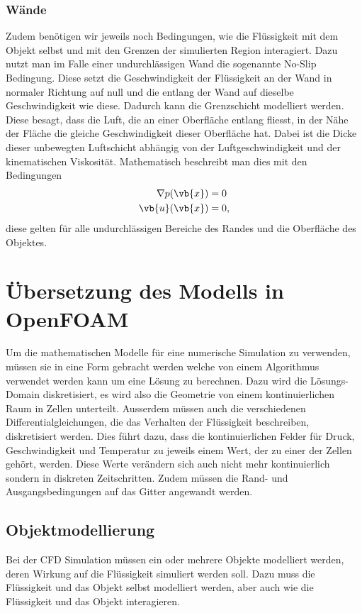 \subsubsection{Wände}
Zudem benötigen wir jeweils noch Bedingungen, wie die Flüssigkeit mit dem Objekt selbst und mit den Grenzen der simulierten Region interagiert.
Dazu nutzt man im Falle einer undurchlässigen Wand die sogenannte No-Slip Bedingung. 
Diese setzt die Geschwindigkeit der Flüssigkeit an der Wand in normaler Richtung auf null und die entlang der Wand auf dieselbe Geschwindigkeit wie diese.
Dadurch kann die Grenzschicht modelliert werden. Diese besagt, dass die Luft, die an einer Oberfläche entlang fliesst, in der Nähe der Fläche die gleiche Geschwindigkeit dieser Oberfläche hat.
Dabei ist die Dicke dieser unbewegten Luftschicht abhängig von der Luftgeschwindigkeit und der kinematischen Viskosität.
Mathematisch beschreibt man dies mit den Bedingungen
\begin{align*}
 \nabla p(\vb{x}) &= 0 \\
\vb{u}(\vb{x}) &= 0 ,
\end{align*}
diese gelten für alle undurchlässigen Bereiche des Randes und die Oberfläche des Objektes.

\section{Übersetzung des Modells in OpenFOAM}
Um die mathematischen Modelle für eine numerische Simulation zu verwenden, müssen sie in eine Form gebracht werden welche von einem Algorithmus verwendet werden kann um eine Lösung zu berechnen.
Dazu wird die Lösungs-Domain diskretisiert, es wird also die Geometrie von einem kontinuierlichen Raum in Zellen unterteilt.
Ausserdem müssen auch die verschiedenen Differentialgleichungen, die das Verhalten der Flüssigkeit beschreiben, diskretisiert werden.
Dies führt dazu, dass die kontinuierlichen Felder für Druck, Geschwindigkeit und Temperatur zu jeweils einem Wert, der zu einer der Zellen gehört, werden.
Diese Werte verändern sich auch nicht mehr kontinuierlich sondern in diskreten Zeitschritten.
Zudem müssen die Rand- und Ausgangsbedingungen auf das Gitter angewandt werden.


\subsection{Objektmodellierung}
Bei der CFD Simulation müssen ein oder mehrere Objekte modelliert werden, deren Wirkung auf die Flüssigkeit simuliert werden soll. 
Dazu muss die Flüssigkeit und das Objekt selbst modelliert werden, aber auch wie die Flüssigkeit und das Objekt interagieren.

